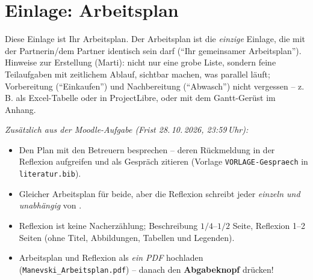 \section{Einlage: Arbeitsplan}
\label{sec:arbeitsplan}

\begin{hinweise}
Diese Einlage ist Ihr Arbeitsplan. Der Arbeitsplan ist die \emph{einzige} Einlage, die mit der Partnerin/dem
Partner identisch sein darf (\enquote{Ihr gemeinsamer Arbeitsplan}). Hinweise zur Erstellung (Marti): nicht nur
eine grobe Liste, sondern feine Teilaufgaben mit zeitlichem Ablauf, sichtbar machen, was parallel läuft;
Vorbereitung (\enquote{Einkaufen}) und Nachbereitung (\enquote{Abwasch}) nicht vergessen -- z.\,B. als
Excel-Tabelle oder in ProjectLibre, oder mit dem Gantt-Gerüst im Anhang.

\smallskip\emph{Zusätzlich aus der Moodle-Aufgabe (Frist 28.\,10.\,2026, 23:59\,Uhr):}
\begin{itemize}\itemsep0pt
\item Den Plan mit den Betreuern besprechen -- deren Rückmeldung in der Reflexion aufgreifen und als
      Gespräch zitieren (Vorlage \texttt{VORLAGE-Gespraech} in \texttt{literatur.bib}).
\item Gleicher Arbeitsplan für beide, aber die Reflexion schreibt jeder \emph{einzeln und unabhängig} von
      \Partner.
\item Reflexion ist keine Nacherzählung; Beschreibung $1/4$--$1/2$ Seite, Reflexion 1--2 Seiten
      (ohne Titel, Abbildungen, Tabellen und Legenden).
\item Arbeitsplan und Reflexion als \emph{ein PDF} hochladen (\texttt{Manevski\_Arbeitsplan.pdf}) --
      danach den \textbf{Abgabeknopf} drücken!
\end{itemize}
\end{hinweise}

